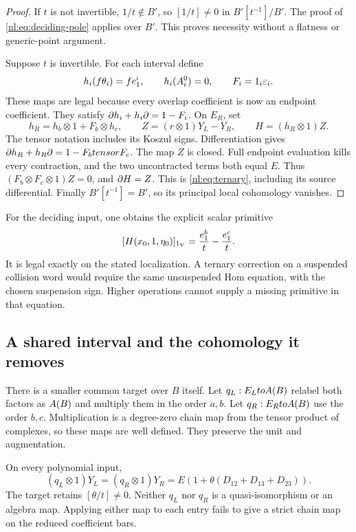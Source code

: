 \begin{proof}
If \(t\) is not invertible, \(1/t\notin B'\), so
\([1/t]\ne0\) in \(B'[t^{-1}]/B'\).
The proof of \eqref{nl:eq:deciding-pole} applies over \(B'\).
This proves necessity without a flatness or generic-point argument.

Suppose \(t\) is invertible. For each interval define
\[
 h_i(f\theta_i)=fe_1^i,\qquad h_i(A_i^0)=0,\qquad
 F_i=1_i\varepsilon_i.
\]
These maps are legal because every overlap coefficient is now an endpoint
coefficient. They satisfy \(\partial h_i+h_i\partial=1-F_i\).
On \(E_R\), set
\[
 h_R=h_b\otimes1+F_b\otimes h_c,
 \qquad Z=(r\otimes1)Y_L-Y_R,
 \qquad H=(h_R\otimes1)Z.
\]
The tensor notation includes its Koszul signs. Differentiation gives
\(\partial h_R+h_R\partial=1-F_btensor F_c\).
The map \(Z\) is closed. Full endpoint evaluation kills every contraction,
and the two uncontracted terms both equal \(E\). Thus
\((F_b\otimes F_c\otimes1)Z=0\), and \(\partial H=Z\).
This is \eqref{nl:eq:ternary}, including its source differential.
Finally \(B'[t^{-1}]=B'\), so its principal local cohomology vanishes.
\end{proof}

For the deciding input, one obtains the explicit scalar primitive
\[
 [H(x_0,1,\eta_0)]_{1_{V}}
       =\frac{e_1^b}{t}-\frac{e_1^c}{t}.
\]
It is legal exactly on the stated localization. A ternary correction
on a suspended collision word would require the same unsuspended Hom
equation, with the chosen suspension sign. Higher operations cannot
supply a missing primitive in that equation.

\subsection{A shared interval and the cohomology it removes}

There is a smaller common target over \(B\) itself. Let
\(q_L:E_LtoA(B)\) relabel both factors as \(A(B)\) and
multiply them in the order \(a,b\). Let \(q_R:E_RtoA(B)\)
use the order \(b,c\). Multiplication is a degree-zero chain map
from the tensor product of complexes, so these maps are well defined.
They preserve the unit and augmentation.

\begin{proposition}\label{nl:prop:quotient}
On every polynomial input,
\begin{equation}\label{nl:eq:shared}
 (q_L\otimes1)Y_L=(q_R\otimes1)Y_R
       =E(1+\theta(D_{12}+D_{13}+D_{23})).
\end{equation}
The target retains \([\theta/t]\ne0\).
Neither \(q_L\) nor \(q_R\) is a quasi-isomorphism or an algebra map.
Applying either map to each entry fails to give a strict chain map
on the reduced coefficient bars.
\end{proposition}


